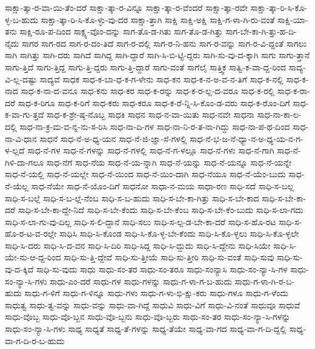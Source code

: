 {ಸಾಕ್ಷಾ-ತ್ಕಾ-ರ-ವಾ-ಯಿ-ತೆಂ-ದರೆ
ಸಾಕ್ಷಾ-ತ್ಕಾ-ರ-ವಿನ್ನೂ
ಸಾಕ್ಷಾ-ತ್ಕಾ-ರ-ವೆಂದರೆ
ಸಾಕ್ಷಾ-ತ್ಕಾ-ರವೇ
ಸಾಕ್ಷಾ-ತ್ಕಾ-ರಿ-ಸಿ-ಕೊ-ಳ್ಳ-ಬ-ಹುದು
ಸಾಕ್ಷಾ-ತ್ಕಾ-ರಿ-ಸಿ-ಕೊ-ಳ್ಳು-ವು-ದರ
ಸಾಕ್ಷಾ-ತ್ತಾಗಿ
ಸಾಕ್ಷಿ
ಸಾಕ್ಷಿ-ಅಕ್ಷಿ
ಸಾಕ್ಷಿ-ಗ-ಳಾ-ಗಿ-ರು-ವಂತೆ
ಸಾಕ್ಷಿ-ಯಾ-ತನು
ಸಾಕ್ಷಿ-ರೂ-ಪ-ದಿಂದ
ಸಾಕ್ಷ್ಯ-ವೊಂ-ದನ್ನು
ಸಾಗ-ತೊ-ಡ-ಗಿತು
ಸಾಗ-ತೊ-ಡ-ಗಿತ್ತು
ಸಾಗ-ಬೇ-ಕಾ-ಗಿ-ತ್ತು-ಹ-ದಿ-ನೈದು
ಸಾಗರ
ಸಾಗ-ರದ
ಸಾಗ-ರ-ದಂ-ತಿದೆ
ಸಾಗ-ರ-ದಲ್ಲಿ
ಸಾಗ-ರ-ನಿ-ಹನು
ಸಾಗ-ರ-ವನ್ನು
ಸಾಗ-ರ-ವಿ-ದ್ದಂತೆ
ಸಾಗಲು
ಸಾಗಿ
ಸಾಗಿತ್ತು
ಸಾಗಿ-ದರು
ಸಾಗಿದೆ
ಸಾಗಿದ್ದ
ಸಾಗಿ-ದ್ದಾರೆ
ಸಾಗಿ-ಸಿ-ಬಿ-ಟ್ಟಿ-ದ್ದರು
ಸಾಗಿ-ಸು-ವು-ದ-ಕ್ಕಾಗಿ
ಸಾಗು
ಸಾಗು-ತ್ತಾನೆ
ಸಾಗು-ತ್ತಿದೆ
ಸಾಗು-ತ್ತಿದ್ದ
ಸಾಗು-ತ್ತಿ-ದ್ದರು
ಸಾಗು-ತ್ತಿ-ದ್ದಾರೆ
ಸಾಗು-ವಂತೆ
ಸಾಗೆಲೈ
ಸಾತ್ತ್ವಿಕ
ಸಾತ್ವಿ-ಕ-ವಾ-ದ್ದ-ರಿಂದ
ಸಾದ್ಯ-ವಿ-ಲ್ಲ-ದಷ್ಟು
ಸಾದ್ಯವೆ
ಸಾಧಕ
ಸಾಧ-ಕ-ಬಾ-ಧ-ಕ-ಗ-ಳೇನು
ಸಾಧ-ಕನ
ಸಾಧ-ಕ-ನ-ಅ-ವ-ನ-ತಿಗೆ
ಸಾಧ-ಕ-ನಲ್ಲಿ
ಸಾಧ-ಕ-ನಾದ
ಸಾಧ-ಕ-ನಾ-ದ-ವನೂ
ಸಾಧ-ಕನು
ಸಾಧ-ಕರ
ಸಾಧ-ಕ-ರನ್ನು
ಸಾಧ-ಕ-ರ-ಲ್ಲ-ದ-ವರೂ
ಸಾಧ-ಕ-ರಲ್ಲಿ
ಸಾಧ-ಕ-ರಾ-ದರೆ
ಸಾಧ-ಕ-ರಿಗೂ
ಸಾಧ-ಕ-ರಿಗೆ
ಸಾಧ-ಕರು
ಸಾಧ-ಕರೂ
ಸಾಧ-ಕ-ರೆ-ನ್ನಿ-ಸಿ-ಕೊಂ-ಡ-ವರು
ಸಾಧ-ಕ-ರೊಂ-ದಿಗೆ
ಸಾಧ-ಕ-ವಾ-ಗು-ತ್ತದೆ
ಸಾಧ-ಕ-ಶ್ರೇ-ಷ್ಠ-ನೊಬ್ಬ
ಸಾಧಕಿ
ಸಾಧನ
ಸಾಧ-ನ-ವಾ-ಯಿತು
ಸಾಧ-ನವೇ
ಸಾಧನಾ
ಸಾಧ-ನಾ-ಕಾ-ಲ-ದಲ್ಲಿ
ಸಾಧ-ನಾ-ಕ್ರ-ಮ-ವ-ನ್ನ-ನು-ಸ-ರಿಸಿ
ಸಾಧ-ನಾ-ದಿ-ಗಳ
ಸಾಧ-ನಾ-ನಿ-ರ-ತ-ನಾ-ಗಿದ್ದು
ಸಾಧ-ನಾ-ಪ-ಥ-ದಿಂದ
ಸಾಧ-ನಾ-ವಿ-ಧಾನ
ಸಾಧನೆ
ಸಾಧ-ನೆ-ಅ-ಧ್ಯ-ಯನ
ಸಾಧ-ನೆ-ಜಿ-ಜ್ಞಾ-ಸೆ-ಗಳಲ್ಲಿ
ಸಾಧ-ನೆ-ಭ-ಜ-ನೆ-ಧ್ಯಾ-ನ-ಅ-ಧ್ಯ-ಯ-ನ-ಗ-ಳ-ಲ್ಲದೆ
ಸಾಧ-ನೆ-ಗಳ
ಸಾಧ-ನೆ-ಗಳನ್ನು
ಸಾಧ-ನೆ-ಗಳಲ್ಲಿ
ಸಾಧ-ನೆ-ಗ-ಳಲ್ಲೂ
ಸಾಧ-ನೆ-ಗಳು
ಸಾಧ-ನೆ-ಗಾಗಿ
ಸಾಧ-ನೆ-ಗಿಳಿ-ದಾ-ಗಲೂ
ಸಾಧ-ನೆಗೆ
ಸಾಧ-ನೆಯ
ಸಾಧ-ನೆ-ಯ-ನ್ನಾಗಿ
ಸಾಧ-ನೆ-ಯನ್ನು
ಸಾಧ-ನೆ-ಯನ್ನೂ
ಸಾಧ-ನೆ-ಯನ್ನೇ
ಸಾಧ-ನೆ-ಯಲ್ಲಿ
ಸಾಧ-ನೆ-ಯಲ್ಲೇ
ಸಾಧ-ನೆ-ಯಿಂದ
ಸಾಧ-ನೆ-ಯಿಂ-ದಾಗಿ
ಸಾಧ-ನೆಯೂ
ಸಾಧ-ನೆ-ಯೆಂ-ಬುದು
ಸಾಧ-ನೆ-ಯೆಲ್ಲ
ಸಾಧ-ನೆಯೇ
ಸಾಧ-ನೆ-ಯೊಂ-ದಿಗೆ
ಸಾಧನೋ
ಸಾಧಾ-ನ-ಮಯ
ಸಾಧಾ-ರಣ
ಸಾಧಿ-ಸದೆ
ಸಾಧಿ-ಸ-ಬಲ್ಲ
ಸಾಧಿ-ಸ-ಬಲ್ಲೆ
ಸಾಧಿ-ಸ-ಬ-ಲ್ಲೆ-ನೆಂಬ
ಸಾಧಿ-ಸ-ಬ-ಹುದು
ಸಾಧಿ-ಸ-ಬೇ-ಕಾ-ಗಿತ್ತು
ಸಾಧಿ-ಸ-ಬೇ-ಕಾದ
ಸಾಧಿ-ಸ-ಬೇ-ಕಾ-ದರೆ
ಸಾಧಿ-ಸ-ಬೇ-ಕಾ-ದ್ದೇ-ನಿದೆ
ಸಾಧಿ-ಸ-ಬೇ-ಕೆಂದು
ಸಾಧಿ-ಸ-ಬೇ-ಕೆಂಬ
ಸಾಧಿ-ಸ-ಬೇ-ಕೆಂ-ಬುದು
ಸಾಧಿ-ಸ-ಲಾ-ಗದು
ಸಾಧಿ-ಸ-ಲಾ-ಗು-ವು-ದಿಲ್ಲ
ಸಾಧಿ-ಸ-ಲಿ-ದ್ದಾನೆ
ಸಾಧಿ-ಸಲು
ಸಾಧಿ-ಸ-ಲ್ಪ-ಡ-ಬೇ-ಕಾ-ದರೆ
ಸಾಧಿ-ಸ-ಹೊ-ರಟ
ಸಾಧಿ-ಸ-ಹೊ-ರ-ಟ-ವ-ರಲ್ಲೇ
ಸಾಧಿಸಿ
ಸಾಧಿ-ಸಿ-ಕೊಂಡ
ಸಾಧಿ-ಸಿ-ಕೊ-ಳ್ಳ-ಬೇ-ಕೆಂದು
ಸಾಧಿ-ಸಿ-ಕೊ-ಳ್ಳಲು
ಸಾಧಿ-ಸಿ-ಕೊ-ಳ್ಳಲೇ
ಸಾಧಿ-ಸಿ-ದರು
ಸಾಧಿ-ಸಿ-ದ-ವನ
ಸಾಧಿ-ಸಿ-ದಿರಿ
ಸಾಧಿ-ಸಿದ್ದ
ಸಾಧಿ-ಸಿ-ದ್ದುದು
ಸಾಧಿ-ಸಿ-ದ್ದೇನು
ಸಾಧಿ-ಸಿಯೇ
ಸಾಧಿ-ಸಿ-ಯೇ-ನು-ಆ-ದ್ದ-ರಿಂದ
ಸಾಧಿ-ಸು-ತ್ತಿ-ದ್ದೇವೆ
ಸಾಧಿ-ಸು-ತ್ತೀಯೆ
ಸಾಧಿ-ಸು-ತ್ತೀರಿ
ಸಾಧಿ-ಸು-ವಂತೆ
ಸಾಧಿ-ಸುವು
ಸಾಧಿ-ಸು-ವು-ದ-ಕ್ಕಿದೆ
ಸಾಧಿ-ಸು-ವುದು
ಸಾಧು
ಸಾಧು-ಸಂ-ತರ
ಸಾಧು-ಸಂ-ತರೂ
ಸಾಧು-ಸಂನ್ಯಾಸಿ
ಸಾಧು-ಸಂ-ನ್ಯಾ-ಸಿ-ಗಳ
ಸಾಧು-ಸಂ-ನ್ಯಾ-ಸಿ-ಗಳು
ಸಾಧು-ಎಂ-ದರೆ
ಸಾಧು-ಗಳ
ಸಾಧು-ಗಳನ್ನು
ಸಾಧು-ಗ-ಳಾ-ಗ-ಬ-ಹುದು
ಸಾಧು-ಗ-ಳಾ-ಗಿ-ರ-ಬ-ಹುದು
ಸಾಧು-ಗ-ಳಿಗೆ
ಸಾಧು-ಗ-ಳಿನ್ನೂ
ಸಾಧು-ಗಳು
ಸಾಧು-ಗ-ಳು-ಭಿ-ಕ್ಷು-ಕರು
ಸಾಧು-ಗಳೂ
ಸಾಧು-ಗ-ಳೆಂದು
ಸಾಧುತ್ವ
ಸಾಧು-ತ್ವ-ವನ್ನು
ಸಾಧು-ವನ್ನು
ಸಾಧು-ವಾ-ಗಿದ್ದೆ
ಸಾಧುವಿ
ಸಾಧು-ವಿಗೆ
ಸಾಧು-ವಿ-ನಂತೆ
ಸಾಧುವೂ
ಸಾಧುವೆ
ಸಾಧು-ವೊಬ್ಬ
ಸಾಧು-ವೊ-ಬ್ಬನ
ಸಾಧು-ವೊ-ಬ್ಬನು
ಸಾಧು-ವೊ-ಬ್ಬರು
ಸಾಧು-ಸಂ-ತರ
ಸಾಧು-ಸಂ-ನ್ಯಾ-ಸಿ-ಗಳನ್ನು
ಸಾಧು-ಸಂ-ನ್ಯಾ-ಸಿ-ಗಳು
ಸಾಧ್ಯ
ಸಾಧ್ಯತೆ
ಸಾಧ್ಯ-ತೆ-ಗಳನ್ನು
ಸಾಧ್ಯ-ತೆಯೇ
ಸಾಧ್ಯ-ವಾ-ಗದ
ಸಾಧ್ಯ-ವಾ-ಗ-ದಿ-ದ್ದಲ್ಲಿ
ಸಾಧ್ಯ-ವಾ-ಗ-ದಿ-ರ-ಬ-ಹುದು
}
